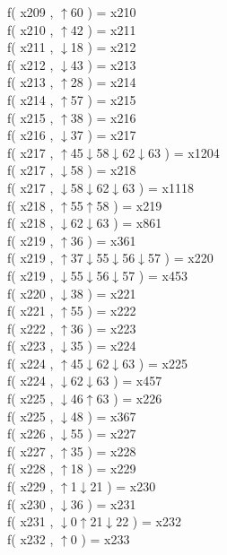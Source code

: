 f( x209 , $\uparrow$60 ) = x210 \\
f( x210 , $\uparrow$42 ) = x211 \\
f( x211 , $\downarrow$18 ) = x212 \\
f( x212 , $\downarrow$43 ) = x213 \\
f( x213 , $\uparrow$28 ) = x214 \\
f( x214 , $\uparrow$57 ) = x215 \\
f( x215 , $\uparrow$38 ) = x216 \\
f( x216 , $\downarrow$37 ) = x217 \\
f( x217 , $\uparrow$45$\downarrow$58$\downarrow$62$\downarrow$63 ) = x1204 \\
f( x217 , $\downarrow$58 ) = x218 \\
f( x217 , $\downarrow$58$\downarrow$62$\downarrow$63 ) = x1118 \\
f( x218 , $\uparrow$55$\uparrow$58 ) = x219 \\
f( x218 , $\downarrow$62$\downarrow$63 ) = x861 \\
f( x219 , $\uparrow$36 ) = x361 \\
f( x219 , $\uparrow$37$\downarrow$55$\downarrow$56$\downarrow$57 ) = x220 \\
f( x219 , $\downarrow$55$\downarrow$56$\downarrow$57 ) = x453 \\
f( x220 , $\downarrow$38 ) = x221 \\
f( x221 , $\uparrow$55 ) = x222 \\
f( x222 , $\uparrow$36 ) = x223 \\
f( x223 , $\downarrow$35 ) = x224 \\
f( x224 , $\uparrow$45$\downarrow$62$\downarrow$63 ) = x225 \\
f( x224 , $\downarrow$62$\downarrow$63 ) = x457 \\
f( x225 , $\downarrow$46$\uparrow$63 ) = x226 \\
f( x225 , $\downarrow$48 ) = x367 \\
f( x226 , $\downarrow$55 ) = x227 \\
f( x227 , $\uparrow$35 ) = x228 \\
f( x228 , $\uparrow$18 ) = x229 \\
f( x229 , $\uparrow$1$\downarrow$21 ) = x230 \\
f( x230 , $\downarrow$36 ) = x231 \\
f( x231 , $\downarrow$0$\uparrow$21$\downarrow$22 ) = x232 \\
f( x232 , $\uparrow$0 ) = x233 \\

